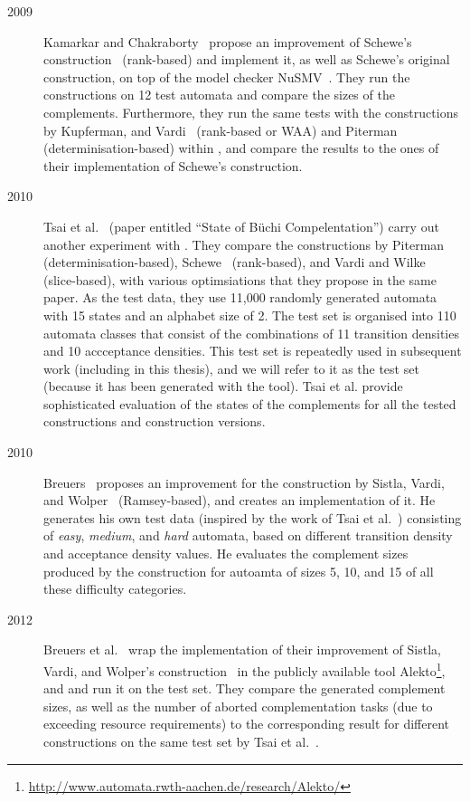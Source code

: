 \begin{description}
\item[2009] Kamarkar and Chakraborty~\cite{2009_karmarkar} propose an improvement of Schewe's construction~\cite{schewe2009buchi} (rank-based) and implement it, as well as Schewe's original construction, on top of the model checker NuSMV~\cite{1999_nusmv}\cite{2002_nusmv}. They run the constructions on 12 test automata and compare the sizes of the complements. Furthermore, they run the same tests with the constructions by  Kupferman, and Vardi~\cite{Kupferman:2001} (rank-based or WAA) and Piterman~\cite{2007_piterman} (determinisation-based) within \goal, and compare the results to the ones of their implementation of Schewe's construction.

\item[2010] Tsai et al.~\cite{2011_tsai} (paper entitled ``State of Büchi Compelentation'') carry out another experiment with \goal. They compare the constructions by Piterman~\cite{2007_piterman} (determinisation-based), Schewe~\cite{schewe2009buchi} (rank-based), and Vardi and Wilke~\cite{vardi2007automata} (slice-based), with various optimsiations that they propose in the same paper. As the test data, they use 11,000 randomly generated automata with 15 states and an alphabet size of 2. The test set is organised into 110 automata classes that consist of the combinations of 11 transition densities and 10 accceptance densities. This test set is repeatedly used in subsequent work (including in this thesis), and we will refer to it as the \goal{} test set (because it has been generated with the \goal{} tool). Tsai et al. provide sophisticated evaluation of the states of the complements for all the tested constructions and construction versions.

\item[2010] Breuers~\cite{2010_breuers_bsc} proposes an improvement for the construction by Sistla, Vardi, and Wolper~\cite{PrasadSistla1987217} (Ramsey-based), and creates an implementation of it. He generates his own test data (inspired by the work of Tsai et al.~\cite{2011_tsai}) consisting of \textit{easy}, \textit{medium}, and \textit{hard} automata, based on different transition density and acceptance density values. He evaluates the complement sizes produced by the construction for autoamta of sizes 5, 10, and 15 of all these difficulty categories.

\item[2012] Breuers et al.~\cite{2012_breuers} wrap the implementation of their improvement of Sistla, Vardi, and Wolper's construction~\cite{PrasadSistla1987217} in the publicly available tool Alekto\footnote{\url{http://www.automata.rwth-aachen.de/research/Alekto/}}, and and run it on the \goal{} test set. They compare the generated complement sizes, as well as the number of aborted complementation tasks (due to exceeding resource requirements) to the corresponding result for different constructions on the same test set by Tsai et al.~\cite{2011_tsai}.


\end{description}
